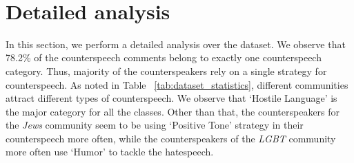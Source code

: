 \documentclass[11pt,a4paper]{article}
\begin{document}
{\begin{table}[!htbp]
		\caption{Statistics of the counterspeech dataset. Numbers corresponding to each of the target community, grouped as per the type of counterspeech are shown.}
		~\label{tab:dataset_statistics}
	\end{table}



	

	
\vspace{-8mm}
\section{Detailed analysis}

In this section, we perform a detailed analysis over the dataset. We observe that 78.2\% of the counterspeech comments belong to exactly one counterspeech category. Thus, majority of the counterspeakers rely on a single strategy for counterspeech. As noted in Table ~\ref{tab:dataset_statistics}, different communities attract different types of counterspeech. We observe that `Hostile Language' is the major category for all the classes. Other than that, the counterspeakers for the {\sl Jews} community seem to be using `Positive Tone' strategy in their counterspeech more often, while the counterspeakers of the {\sl LGBT} community more often use `Humor' to tackle the hatespeech. 


}
\end{document}
